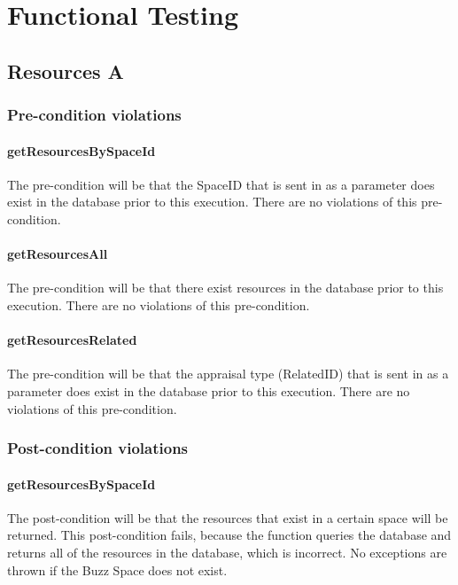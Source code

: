 \documentclass[a4paper]{article}
\begin{document}
\section {Functional Testing}

\subsection {Resources A}
\subsubsection {Pre-condition violations}

\paragraph{getResourcesBySpaceId}
The pre-condition will be that the SpaceID that is sent in as a parameter does exist in the database prior to this execution. There are no violations of this pre-condition.

\paragraph{getResourcesAll}
The pre-condition will be that there exist resources in the database prior to this execution. There are no violations of this pre-condition.

\paragraph{getResourcesRelated}
The pre-condition will be that the appraisal type (RelatedID) that is sent in as a parameter does exist in the database prior to this execution. There are no violations of this pre-condition. 

\subsubsection {Post-condition violations}

\paragraph{getResourcesBySpaceId}
The post-condition will be that the resources that exist in a certain space will be returned. This post-condition fails, because the function queries the database and returns all of the resources in the database, which is incorrect. No exceptions are thrown if the Buzz Space does not exist.
\end{document}
